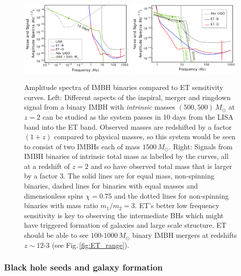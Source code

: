 \begin{figure}[tb]
\begin{center}
\includegraphics[width=0.49\textwidth]{./Sec_ET_ScienceCase/IMBH1.pdf}
\includegraphics[width=0.49\textwidth]{./Sec_ET_ScienceCase/IMBH2.pdf}
\end{center}
\caption{Amplitude spectra of IMBH binaries compared to ET sensitivity
curves. Left: Different aspects of the inspiral, merger and ringdown 
signal from a binary IMBH with {\em intrinsic} masses $(500,500)\,M_\odot$ 
at $z=2$ can be studied as the system passes in 10 days from the LISA band into 
the ET band. Observed masses are redshifted by a factor $(1+z)$ compared
to physical masses, so this system would be seen to consist of two 
IMBHs each of mass $1500\,M_\odot$. 
Right: Signals from IMBH binaries of intrinsic total mass as labelled by
the curves, all at a redshift of $z=2$ and so have observed total mass 
that is larger by a factor $3.$ The solid lines are for equal mass, 
non-spinning binaries, dashed lines for binaries with equal masses 
and dimensionless spins $\chi = 0.75$ and the dotted lines for 
non-spinning binaries with mass ratio $m_1/m_2=3$. ET's better low
frequency sensitivity is key to observing the intermediate BHs which
might have triggered formation of galaxies and large scale structure.
ET should be able to see $100$-$1000\,M_\odot$ binary IMBH mergers at redshifts
$z\sim 12$-$3$ (see Fig.\,\ref{fig:ET_range}).
}
\label{fig:IMBH}
\end{figure}

\subsubsection{Black hole seeds and galaxy formation}

